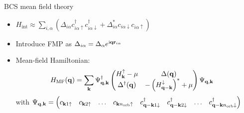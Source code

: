 \documentclass[aspectratio=169]{beamer}
\begin{document}
\begin{frame}
	
	BCS mean field theory
	\begin{itemize}
		\item \(H_{\mathrm{int}} \approx \sum_{i, \alpha} \left(\Delta_{i \alpha} c_{i \alpha \uparrow}^{\dagger} c_{i \alpha \downarrow}^{\dagger} + \Delta_{i \alpha}^{*} c_{i \alpha \downarrow} c_{i \alpha \uparrow}\right)\)
		\item Introduce FMP as \(\Delta_{i \alpha} = \Delta_{\alpha} e^{\mathrm{i} \mathbf{q} \mathbf{r}_{i \alpha}}\)
		\item Mean-field Hamiltonian:
		\begin{align}
			H_{\mathrm{MF}} (\mathbf{q}) &= \sum_{\mathbf{k}} \Psi_{\mathbf{q}, \mathbf{k}}^{\dagger} 	\begin{pmatrix}
				H^{\uparrow}_{\mathbf{k}} - \mu & \Delta (\mathbf{q}) \\
				\Delta^{\dagger} (\mathbf{q}) & - \left(H^{\downarrow}_{\mathbf{q} - \mathbf{k}}\right)^* + \mu
			\end{pmatrix} \Psi_{\mathbf{q}, \mathbf{k}}
		\end{align}
		with \(\Psi_{\mathbf{q}, \mathbf{k}} = 
		\begin{pmatrix}
			c_{\mathbf{k} 1 \uparrow} & 
			c_{\mathbf{k} 2 \uparrow} &
			\ldots &
			c_{\mathbf{k} n_{\mathrm{orb}} \uparrow} &
			c_{\mathbf{q} -\mathbf{k} 1 \downarrow}^{\dagger} &
			c_{\mathbf{q} -\mathbf{k} 2 \downarrow}^{\dagger} &
			\ldots &
			c_{\mathbf{q} -\mathbf{k} n_{\mathrm{orb}} \downarrow}^{\dagger}
		\end{pmatrix}\)
	\end{itemize}
\end{frame}

\end{document}
